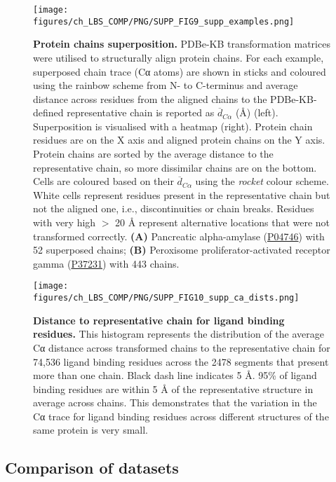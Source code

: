 \begin{figure}[htb!]
    \centering
    \texttt{[image: figures/ch\_LBS\_COMP/PNG/SUPP\_FIG9\_supp\_examples.png]}
    \caption[Protein chains superposition]{\textbf{Protein chains superposition.} PDBe-KB transformation matrices were utilised to structurally align protein chains. For each example, superposed chain trace (Cα atoms) are shown in sticks and coloured using the rainbow scheme from N- to C-terminus and average distance across residues from the aligned chains to the PDBe-KB-defined representative chain is reported as $\overline{d}_{C\alpha}$ (\AA{}) (left). Superposition is visualised with a heatmap (right). Protein chain residues are on the X axis and aligned protein chains on the Y axis. Protein chains are sorted by the average distance to the representative chain, so more dissimilar chains are on the bottom. Cells are coloured based on their $\overline{d}_{C\alpha}$ using the \textit{rocket} colour scheme. White cells represent residues present in the representative chain but not the aligned one, i.e., discontinuities or chain breaks. Residues with very high $>$ 20 \AA{} represent alternative locations that were not transformed correctly. \textbf{(A)} Pancreatic alpha-amylase (\href{https://www.uniprot.org/uniprotkb/P04746/entry}{P04746}) with 52 superposed chains; \textbf{(B)} Peroxisome proliferator-activated receptor gamma (\href{https://www.uniprot.org/uniprotkb/P37231/entry}{P37231}) with 443 chains.}
    \label{fig:protein_chain_supp}
\end{figure}

\begin{figure}[htb!]
    \centering
    \texttt{[image: figures/ch\_LBS\_COMP/PNG/SUPP\_FIG10\_supp\_ca\_dists.png]}
    \caption[Distance to representative chain for ligand binding residues]{\textbf{Distance to representative chain for ligand binding residues.} This histogram represents the distribution of the average Cα distance across transformed chains to the representative chain for 74,536 ligand binding residues across the 2478 segments that present more than one chain. Black dash line indicates 5 \AA{}. 95\% of ligand binding residues are within 5 \AA{} of the representative structure in average across chains. This demonstrates that the variation in the Cα trace for ligand binding residues across different structures of the same protein is very small.}
    \label{fig:supp_ca_dists}
\end{figure}

\subsection{Comparison of datasets}

